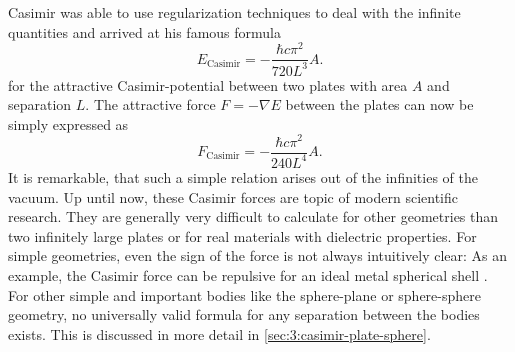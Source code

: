 Casimir was able to use regularization techniques to deal with the infinite quantities and arrived at his famous formula \cite{Casimir_1948}
\begin{equation}\label{eq:3:casimir-energy-pp-conducting}
  E_\mathrm{Casimir} = -\frac{\hbar c \pi^2}{720 L^3} A .
\end{equation}
for the attractive Casimir-potential between two plates with area $A$ and separation $L$.
The attractive force $F=-\nabla E$ between the plates can now be simply expressed as
\begin{equation}\label{eq:3:casimir-force-pp-conducting}
  F_\mathrm{Casimir} = - \frac{\hbar c \pi^2}{240 L^4} A .
\end{equation}
It is remarkable, that such a simple relation arises out of the infinities of the vacuum.
Up until now, these Casimir forces are topic of modern scientific research. They are generally very difficult to calculate for other geometries than two infinitely large plates or for real materials with dielectric properties. 
For simple geometries, even the sign of the force is not always intuitively clear: As an example, the Casimir force can be repulsive for an ideal metal spherical shell \cite{Klimchitskaya_2009}.
For other simple and important bodies like the sphere-plane or sphere-sphere geometry, no universally valid formula for any separation between the bodies exists. This is discussed in more detail in \cref{sec:3:casimir-plate-sphere}.

